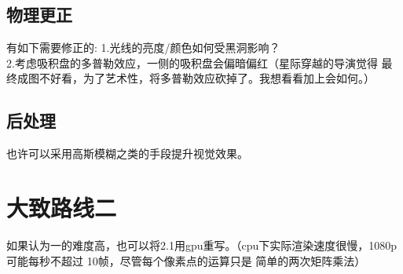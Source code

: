 \documentclass[a4paper, 12pt]{article}
\begin{document}
    \subsection{物理更正}
    有如下需要修正的:
    1.光线的亮度/颜色如何受黑洞影响？\\
    2.考虑吸积盘的多普勒效应，一侧的吸积盘会偏暗偏红（星际穿越的导演觉得
    最终成图不好看，为了艺术性，将多普勒效应砍掉了。我想看看加上会如何。）
    \subsection{后处理}
    也许可以采用高斯模糊之类的手段提升视觉效果。
    \section{大致路线二}
    如果认为一的难度高，也可以将2.1用gpu重写。（cpu下实际渲染速度很慢，1080p可能每秒不超过
    10帧，尽管每个像素点的运算只是
    简单的两次矩阵乘法）

    
\end{document}
